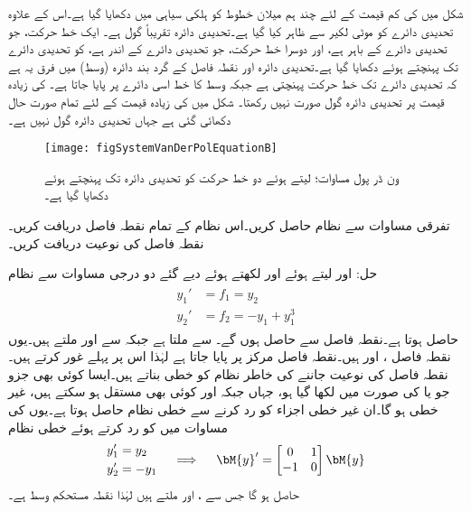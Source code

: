 شکل  میں  کی کم قیمت  کے لئے چند ہم میلان خطوط کو ہلکی سیاہی میں دکھایا گیا ہے۔اس کے علاوہ تحدیدی دائرے کو موٹی لکیر سے ظاہر کیا گیا ہے۔تحدیدی دائرہ تقریباً گول ہے۔ ایک خط حرکت، جو تحدیدی دائرے کے باہر ہے، اور دوسرا خط حرکت، جو تحدیدی دائرے کے اندر  ہے، کو  تحدیدی دائرے تک پہنچتے ہوئے دکھایا گیا ہے۔تحدیدی دائرہ اور نقطہ فاصل کے گرد بند دائرہ (وسط) میں فرق یہ ہے کہ تحدیدی دائرے تک خط حرکت پہنچتی ہے جبکہ وسط کا خط اسی دائرے پر پایا جاتا ہے۔  کی زیادہ قیمت پر تحدیدی دائرہ گول صورت نہیں رکھتا۔ شکل  میں  کی زیادہ قیمت  کے لئے  تمام صورت حال دکھائی گئی ہے جہاں تحدیدی دائرہ گول نہیں ہے۔
\begin{figure}
\centering
\texttt{[image: figSystemVanDerPolEquationB]}
\caption{ون ڈر پول مساوات؛  لیتے ہوئے دو خط حرکت کو تحدیدی دائرہ تک پہنچتے ہوئے دکھایا گیا ہے۔}
\label{شکل_نظام_ون_ڈر_پول_دوسری_شکل}
\end{figure}
تفرقی مساوات  سے نظام حاصل کریں۔اس نظام کے تمام نقطہ فاصل دریافت کریں۔نقطہ فاصل کی نوعیت دریافت کریں۔

حل: اور  لیتے ہوئے اور  لکھتے ہوئے دیے گئے دو درجی مساوات سے نظام
\begin{gather}
\begin{aligned}\label{مساوات_مثال_نظام_تفرقی_سے_نظام}
y_1'&=f_1=y_2\\
y_2'&=f_2=-y_1+y_1^3
\end{aligned}
\end{gather}
 حاصل ہوتا ہے۔نقطہ فاصل  سے حاصل ہوں گے۔ سے  ملتا ہے جبکہ  سے  اور  ملتے ہیں۔یوں نقطہ فاصل ،  اور  ہیں۔نقطہ فاصل  مرکز پر پایا جاتا ہے لہٰذا اس پر پہلے غور کرتے ہیں۔نقطہ فاصل کی نوعیت جاننے کی خاطر نظام کو خطی بناتے ہیں۔ایسا کوئی بھی جزو جو  یا  کی صورت میں لکھا گیا ہو، جہاں  جبکہ  اور  کوئی بھی  مستقل ہو سکتے ہیں، غیر خطی ہو گا۔ان غیر خطی اجزاء کو رد کرنے سے خطی نظام حاصل ہوتا ہے۔یوں  کی مساوات میں  کو رد کرتے ہوئے خطی نظام 
\begin{gather*}
\begin{aligned}
y_1'&=y_2\\
y_2'&=-y_1
\end{aligned}\quad \implies \quad
\begin{aligned}
\bM{y}'=\begin{bmatrix} 0&1\\-1&0 \end{bmatrix}\bM{y}
\end{aligned}
\end{gather*}
حاصل ہو گا جس سے  ،  اور  ملتے ہیں لہٰذا نقطہ  مستحکم وسط ہے۔

